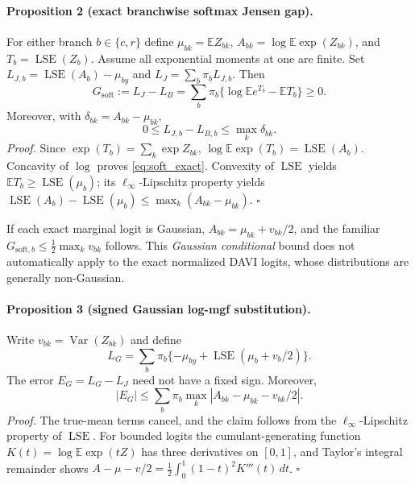 \paragraph{Proposition 2 (exact branchwise softmax Jensen gap).}
For either branch $b\in\{c,r\}$ define
$\mu_{bk}=\mathbb E Z_{bk}$,
$A_{bk}=\log\mathbb E\exp(Z_{bk})$, and
$T_b=\operatorname{LSE}(Z_b)$. Assume all exponential moments at one
are finite. Set
$L_{J,b}=\operatorname{LSE}(A_b)-\mu_{by}$ and
$L_J=\sum_b\pi_b L_{J,b}$.
Then
\begin{equation}
G_{\mathrm{soft}}:=L_J-L_B
=\sum_b\pi_b\{\log\mathbb E e^{T_b}-\mathbb E T_b\}\ge0.
\label{eq:soft_exact}
\end{equation}
Moreover, with $\delta_{bk}=A_{bk}-\mu_{bk}$,
\begin{equation}
0\le L_{J,b}-L_{B,b}\le\max_k\delta_{bk}.
\label{eq:soft_upper_general}
\end{equation}
\emph{Proof.} Since $\exp(T_b)=\sum_k\exp Z_{bk}$,
$\log\mathbb E\exp(T_b)=\operatorname{LSE}(A_b)$.
Concavity of $\log$ proves \eqref{eq:soft_exact}. Convexity of
$\operatorname{LSE}$ yields $\mathbb E T_b\ge\operatorname{LSE}(\mu_b)$;
its $\ell_\infty$-Lipschitz property yields
$\operatorname{LSE}(A_b)-\operatorname{LSE}(\mu_b)
\le\max_k(A_{bk}-\mu_{bk})$. \hfill$\square$

If each exact marginal logit is Gaussian,
$A_{bk}=\mu_{bk}+v_{bk}/2$, and the familiar
$G_{\mathrm{soft},b}\le\frac12\max_k v_{bk}$ follows. This \emph{Gaussian
conditional} bound does not automatically apply to the exact normalized
DAVI logits, whose distributions are generally non-Gaussian.

\paragraph{Proposition 3 (signed Gaussian log-mgf substitution).}
Write $v_{bk}=\operatorname{Var}(Z_{bk})$ and define
\begin{equation}
L_G=\sum_b\pi_b\{-\mu_{by}+
\operatorname{LSE}(\mu_b+v_b/2)\}.
\end{equation}
The error $E_G=L_G-L_J$ need not have a fixed sign. Moreover,
\begin{equation}
|E_G|\le\sum_b\pi_b\max_k
|A_{bk}-\mu_{bk}-v_{bk}/2|.
\end{equation}
\emph{Proof.} The true-mean terms cancel, and the claim follows
from the $\ell_\infty$-Lipschitz property of $\operatorname{LSE}$.
For bounded logits the cumulant-generating function
$K(t)=\log\mathbb E\exp(tZ)$ has three derivatives on $[0,1]$,
and Taylor's integral remainder shows
$A-\mu-v/2=\frac12\int_0^1(1-t)^2 K'''(t)\,dt$. \hfill$\square$


